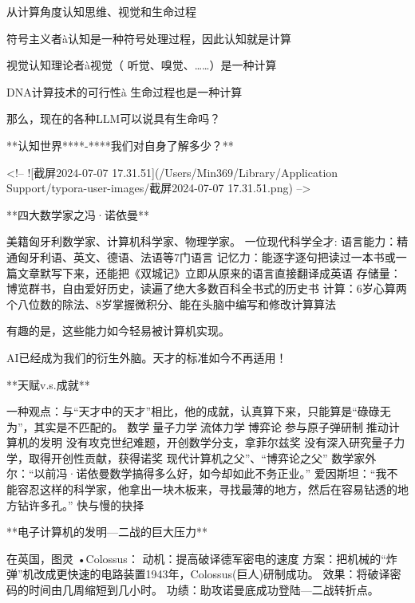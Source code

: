 从计算角度认知思维、视觉和生命过程



符号主义者à认知是一种符号处理过程，因此认知就是计算

视觉认知理论者à视觉（ 听觉、嗅觉、……）是一种计算

DNA计算技术的可行性à 生命过程也是一种计算

那么，现在的各种LLM可以说具有生命吗？



**认知世界****-****我们对自身了解多少？**

<!-- ![截屏2024-07-07 17.31.51](/Users/Min369/Library/Application Support/typora-user-images/截屏2024-07-07 17.31.51.png) -->





**四大数学家之冯·诺依曼**

美籍匈牙利数学家、计算机科学家、物理学家。 
一位现代科学全才:
语言能力：精通匈牙利语、英文、德语、法语等7门语言
记忆力：能逐字逐句把读过一本书或一篇文章默写下来，还能把《双城记》立即从原来的语言直接翻译成英语
存储量：博览群书，自由爱好历史，读遍了绝大多数百科全书式的历史书
计算：6岁心算两个八位数的除法、8岁掌握微积分、能在头脑中编写和修改计算算法



有趣的是，这些能力如今轻易被计算机实现。

AI已经成为我们的衍生外脑。天才的标准如今不再适用！



**天赋v.s.成就**



一种观点：与“天才中的天才”相比，他的成就，认真算下来，只能算是“碌碌无为”，其实是不匹配的。
数学量子力学流体力学博弈论参与原子弹研制推动计算机的发明
没有攻克世纪难题，开创数学分支，拿菲尔兹奖
没有深入研究量子力学，取得开创性贡献，获得诺奖
现代计算机之父”、“博弈论之父” 
数学家外尔：“以前冯·诺依曼数学搞得多么好，如今却如此不务正业。”
爱因斯坦：“我不能容忍这样的科学家，他拿出一块木板来，寻找最薄的地方，然后在容易钻透的地方钻许多孔。”
快与慢的抉择



**电子计算机的发明—二战的巨大压力**



在英国，图灵 •Colossus：
动机：提高破译德军密电的速度
方案：把机械的“炸弹”机改成更快速的电路装置1943年，Colossus(巨人)研制成功。
效果：将破译密码的时间由几周缩短到几小时。
功绩：助攻诺曼底成功登陆---二战转折点。



